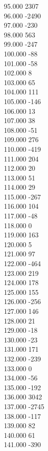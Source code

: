 { 95.000	2307 \\
 96.000	-2490 \\
 97.000	-230 \\
 98.000	563 \\
 99.000	-247 \\
 100.000	-88 \\
 101.000	-58 \\
 102.000	8 \\
 103.000	65 \\
 104.000	111 \\
 105.000	-146 \\
 106.000	13 \\
 107.000	38 \\
 108.000	-51 \\
 109.000	276 \\
 110.000	-419 \\
 111.000	204 \\
 112.000	20 \\
 113.000	51 \\
 114.000	29 \\
 115.000	-267 \\
 116.000	104 \\
 117.000	-48 \\
 118.000	0 \\
 119.000	163 \\
 120.000	5 \\
 121.000	97 \\
 122.000	-464 \\
 123.000	219 \\
 124.000	178 \\
 125.000	155 \\
 126.000	-256 \\
 127.000	146 \\
 128.000	21 \\
 129.000	-18 \\
 130.000	-23 \\
 131.000	171 \\
 132.000	-239 \\
 133.000	0 \\
 134.000	-56 \\
 135.000	-192 \\
 136.000	3042 \\
 137.000	-2745 \\
 138.000	-117 \\
 139.000	82 \\
 140.000	61 \\
 141.000	-390 \\
}
